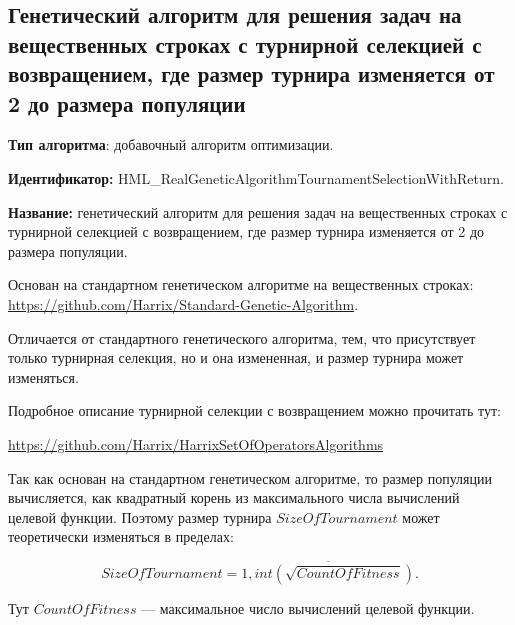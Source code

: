 \subsection{Генетический алгоритм для решения задач на вещественных строках с турнирной селекцией с возвращением, где размер турнира изменяется от 2 до размера популяции}\label{HarrixOptimizationAlgorithms:HML_RealGeneticAlgorithmTournamentSelectionWithReturn}

\textbf{Тип алгоритма}: добавочный алгоритм оптимизации.

\textbf{Идентификатор:} HML\_RealGeneticAlgorithmTournamentSelectionWithReturn.

\textbf{Название:} генетический алгоритм для решения задач на вещественных строках с турнирной селекцией с возвращением, где размер турнира изменяется от 2 до размера популяции.

Основан на стандартном генетическом алгоритме на вещественных строках:  \href{https://github.com/Harrix/Standard-Genetic-Algorithm}{https://github.com/Harrix/Standard-Genetic-Algorithm}. 

Отличается от стандартного генетического алгоритма, тем, что присутствует только турнирная селекция, но и она измененная, и размер турнира может изменяться.

Подробное описание турнирной селекции с возвращением можно прочитать тут:

\href{https://github.com/Harrix/HarrixSetOfOperatorsAlgorithms}{https://github.com/Harrix/HarrixSetOfOperatorsAlgorithms}


Так как основан на стандартном генетическом алгоритме, то размер популяции вычисляется, как квадратный корень из максимального числа вычислений целевой функции. Поэтому размер турнира $SizeOfTournament$ может теоретически  изменяться в пределах:

\begin{equation}
SizeOfTournament = \overline{1,int\left( \sqrt{CountOfFitness}\right) }.
\end{equation}

Тут $CountOfFitness$ --- максимальное число вычислений целевой функции.

